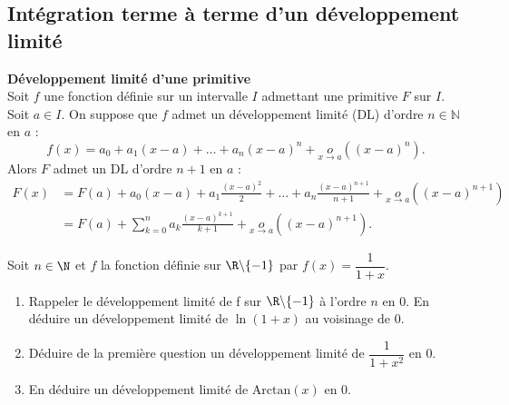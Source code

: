 

\subsection{Intégration terme à terme d'un développement limité}


\begin{Thm}\textbf{Développement limité d'une primitive}\\

Soit \(f\) une fonction définie sur un intervalle \(I\) admettant une primitive \(F\) sur \(I\). Soit \(a \in I\). On suppose que \(f\) admet un développement limité (DL) d’ordre \(n \in \mathbb{N}\) en \(a\) :
\[
f(x) = a_0 + a_1 (x - a) + \ldots + a_n (x - a)^n +\underset{x \to a}{o}\left( (x - a)^n \right).
\]
Alors \(F\) admet un DL d’ordre \(n + 1\) en \(a\) :
\[
\begin{aligned}
F(x) &= F(a) + a_0 (x - a) + a_1 \frac{(x - a)^2}{2} + \ldots + a_n \frac{(x - a)^{n+1}}{n+1} + \underset{x \to a}{o} \left( (x - a)^{n+1} \right)\\
&= F(a) + \sum_{k=0}^{n} a_k \frac{(x - a)^{k+1}}{k+1} + \underset{x \to a}{o} \left( (x - a)^{n+1} \right).
\end{aligned}
\]


\end{Thm}


\begin{Ex}
Soit $n \in \N$ et $f$ la fonction définie sur $\R \backslash \{-1\}$ par $f (x) = \dfrac{1
}{1+x}$.
\begin{enumerate}
\item Rappeler le développement limité de f sur $\R \backslash \{-1\}$ à l’ordre $n$ en $0$.
 En déduire un développement limité de $\ln(1 + x)$ au voisinage de $0$.
\item Déduire de la première question un développement limité de $\dfrac{1}{1+x^2}$ en $0$.
\item En déduire un développement limité de $\text{Arctan}(x)$ en $0$.\\

\end{enumerate}
\end{Ex}




